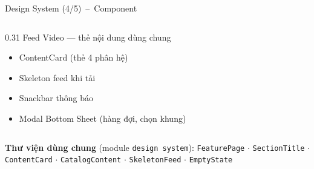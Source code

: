 \documentclass[aspectratio=169]{beamer}
\begin{document}
\begin{frame}{Design System (4/5)~--~Component}
\begin{columns}
\begin{column}{0.31\textwidth}
      {\tiny\color{brandgray} Feed Video --- thẻ nội dung dùng chung}\\[1mm]
      {\tiny
      \begin{itemize}\itemsep2pt
        \item ContentCard (thẻ 4 phân hệ)
        \item Skeleton feed khi tải
        \item Snackbar thông báo
        \item Modal Bottom Sheet (hàng đợi, chọn khung)
      \end{itemize}}
    \end{column}
  \end{columns}
  \vspace{1.5mm}
  {\tiny\textbf{Thư viện dùng chung} (module \texttt{design system}): \texttt{FeaturePage} $\cdot$ \texttt{SectionTitle} $\cdot$ \texttt{ContentCard} $\cdot$ \texttt{CatalogContent} $\cdot$ \texttt{SkeletonFeed} $\cdot$ \texttt{EmptyState}}
\end{frame}
\end{document}
